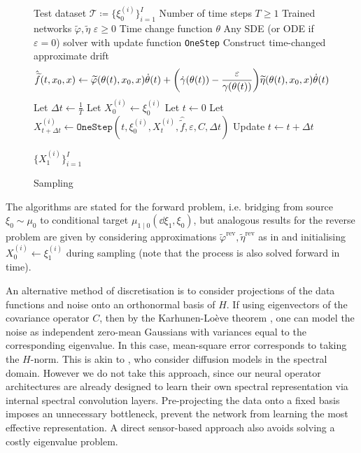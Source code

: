 \begin{figure}
\begin{singlespace}
    \begin{algorithm}[H]
      \setlength{\abovedisplayskip}{2pt}
      \setlength{\belowdisplayskip}{2pt}
      \caption{Sampling}
      \label{alg:sampling}
      \begin{algorithmic}[1]
        \Require Test dataset \(\mathcal{T} \coloneqq \{\xi_{0}^{(i)}\}_{i=1}^{I}\)
        \Require Number of time steps \(T \geq 1\)
        \Require Trained networks \(\widetilde{\varphi}, \widetilde{\eta}\)
        \Require \(\varepsilon \geq 0\)
        \Require Time change function \(\theta\)
        \Require Any SDE (or ODE if \(\varepsilon = 0\)) solver with update function \texttt{OneStep}
        \State Construct time-changed approximate drift \[\hat{\widetilde{f}}(t, x_{0}, x) \leftarrow \widetilde{\varphi}(\theta(t), x_{0}, x)\dot{\theta}(t) + \qty(\dot{\gamma}(\theta(t)) - \frac{\varepsilon}{\gamma(\theta(t))}) \widetilde{\eta}(\theta(t), x_{0}, x)\dot{\theta}(t)\]
        \State Let \(\Delta t \leftarrow \frac{1}{T}\)
        \State Let \(X_{0}^{(i)} \leftarrow \xi_{0}^{(i)}\)
        \State Let \(t \leftarrow 0\)
        \State Let \(X_{t + \Delta t}^{(i)} \leftarrow \texttt{OneStep}(t, \xi_{0}^{(i)}, X_{t}^{(i)}, \hat{\widetilde{f}}, \varepsilon, C, \Delta t)\)
        \State Update \(t \leftarrow t + \Delta t\)
        \EndWhile
        \EndFor
      \end{algorithmic}
      \Return \(\{X_{1}^{(i)}\}_{i=1}^{I}\)
    \end{algorithm}
  \end{singlespace}
\end{figure}

The algorithms are stated for the forward problem, i.e. bridging from source \(\xi_{0} \sim \mu_{0}\) to conditional target \(\mu_{1 \mid 0}(\dd{\xi_{1}, \xi_{0}})\), but analogous results for the reverse problem are given by considering approximations \(\widetilde{\varphi}^{\text{rev}}, \widetilde{\eta}^{\text{rev}}\) as in  and initialising \(X_{0}^{(i)} \leftarrow \xi_{1}^{(i)}\) during sampling (note that the process is also solved forward in time).

An alternative method of discretisation is to consider projections of the data functions and noise onto an orthonormal basis of \(H\). If using eigenvectors of the covariance operator \(C\), then by the Karhunen-Loève theorem \citep{stark1986probability}, one can model the noise as independent zero-mean Gaussians with variances equal to the corresponding eigenvalue. In this case, mean-square error corresponds to taking the \(H\)-norm. This is akin to \citet{phillips2022spectral}, who consider diffusion models in the spectral domain.  However we do not take this approach, since our neural operator architectures are already designed to learn their own spectral representation via internal spectral convolution layers. Pre-projecting the data onto a fixed basis imposes an unnecessary bottleneck, prevent the network from learning the most effective representation. A direct sensor-based approach also avoids solving a costly eigenvalue problem.

